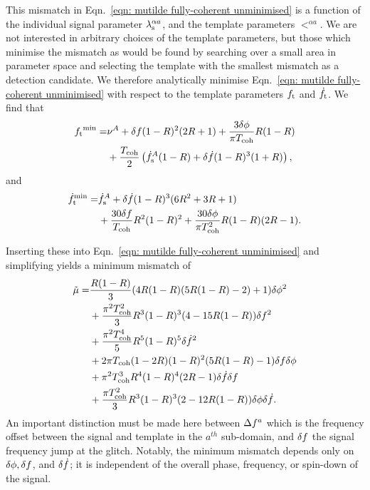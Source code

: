 \documentclass[../full_thesis/full_thesis.tex]{subfiles}
\begin{document}
This mismatch in Eqn.~\eqref{eqn: mutilde fully-coherent unminimised} is a
function of the individual signal parameter ${\lambda}_\textrm{s}^{\alpha a}$, and the template
parameters $\lt^{\alpha a}$. We are not interested in arbitrary choices of the template
parameters, but those which minimise the mismatch as would be found by
searching over a small area in parameter space and selecting the template with
the smallest mismatch as a detection candidate. We therefore
analytically minimise Eqn.~\eqref{eqn: mutilde fully-coherent unminimised} with
respect to the template parameters ${f_{\textrm{t}}}$ and $\dot{f}_{\textrm{t}}$.
We find that
\begin{align}
\begin{split}
{f_{\textrm{t}}}^{\textrm{min}} = &
\nu^A + \delta f(1-R)^2(2R+1)
      + \frac{3\delta\phi}{\pi T_{\mathrm{coh}}}R(1-R) \\
& + \frac{T_{\mathrm{coh}}}{2}\left(\dot{f}_{\textrm{s}}^A(1-R)+\delta\dot{f}(1-R)^{3}(1+R)\right),
\end{split}
\end{align}
and
\begin{align}
\begin{split}
\dot{f}_{\textrm{t}}^{\textrm{min}} = &
\dot{f}_{\textrm{s}}^{A} + \delta\dot{f}(1-R)^{3}(6R^{2} + 3R + 1) \\
& + \frac{30\delta f}{T_{\mathrm{coh}}} R^{2}(1-R)^{2} +
\frac{30\delta\phi}{\pi T_{\mathrm{coh}}^{2}} R (1-R)(2R-1).
\end{split}
\end{align}

Inserting these into Eqn.~\eqref{eqn: mutilde fully-coherent unminimised} and
simplifying yields a minimum mismatch of
\begin{align}
\begin{split}
\tilde{\mu} = & \frac{R(1-R)}{3}(4R(1-R)(5R(1-R)-2) + 1)\delta\phi^{2} \\
& + \frac{\pi^{2}T_{\mathrm{coh}}^{2}}{3} R^{3}(1-R)^{3}(4 - 15R(1-R)) \delta f^{2}\\
& + \frac{\pi^{2}T_{\mathrm{coh}}^{4}}{5} R^{5}(1-R)^{5}\delta\dot{f}^{2} \\
& + 2\pi T_{\mathrm{coh}}(1-2R)(1-R)^{2}(5R(1-R)-1)\delta f\delta\phi\\
& + \pi^{2} T_{\mathrm{coh}}^{3}R^{4}(1-R)^{4}(2R-1)\delta\dot{f}\delta f \\
& + \frac{\pi T_{\mathrm{coh}}^{2}}{3}R^{3}(1-R)^{3}(2-12R(1-R))\delta\phi\delta\dot{f}.
\end{split}
\label{eqn: mismatch fully-coherent glitch}
\end{align}
An important distinction must be made here between $\Delta f^{a}$ which is the
frequency offset between the signal and template in the $a^{th}$ sub-domain, and $\delta f$
the signal frequency jump at the glitch. Notably, the minimum mismatch
depends only on $\delta\phi, \delta f$, and $\delta\dot{f}$; it is
independent of the overall phase, frequency, or spin-down of the signal.
\end{document}
